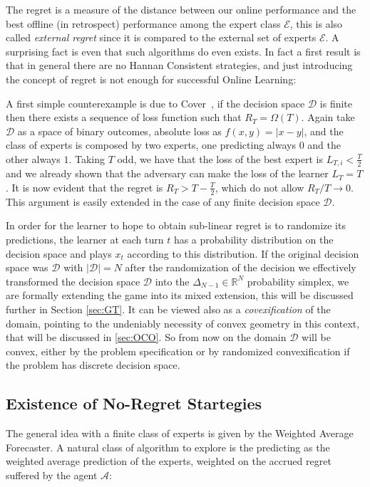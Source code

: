 The regret is a measure of the distance between our online performance and the best offline (in retrospect) performance among the expert class $\mathcal E$, this is also called \emph{external regret} since it is compared to the external set of experts $\mathcal E$. A surprising fact is even that such algorithms do even exists.
In fact a first result is that in general there are no Hannan Consistent strategies, and just introducing the concept of regret is not enough for successful Online Learning: 

A first simple counterexample is due to Cover~\cite{cover1966behavior}, if the decision space $\mathcal D$ is finite then there exists a sequence of loss function such that $R_T=\Omega(T)$.
Again take $\mathcal D$ as a space of binary outcomes, absolute loss as $f(x,y)=|x - y|$, and the class of experts is composed by two experts, one predicting always $0$ and the other always $1$. Taking $T$ odd, we have that the loss of the best expert is $L_{T,i}<\frac{T}{2}$ and we already shown that the adversary can make the loss of the learner $L_T=T$. It is now evident that the regret is $R_T>T-\frac{T}{2}$, which do not allow $R_T/T\to 0$. This argument is easily extended in the case of any finite decision space $\mathcal D$.

In order for the learner to hope to obtain sub-linear regret is to randomize its predictions, the learner at each turn $t$ has a probability distribution on the decision space and plays $x_t$ according to this distribution. If the original decision space was $\mathcal D$ with $|\mathcal D|=N$ after the randomization of the decision we effectively transformed the decision space $\mathcal D$ into the $\Delta_{N-1}\in\mathbb R^{N}$ probability simplex, we are formally extending the game into its mixed extension, this will be discussed further in Section \ref{sec:GT}. It can be viewed also as a \emph{covexification} of the domain, pointing to the undeniably necessity of convex geometry in this context, that will be discussed in \ref{sec:OCO}. So from now on the domain $\mathcal D$ will be convex, either by the problem specification or by randomized convexification if the problem has discrete decision space.

\subsection{Existence of No-Regret Startegies} 
The general idea with a finite class of experts is given by the Weighted Average Forecaster. A natural class of algorithm to explore is the predicting as the weighted average prediction of the experts, weighted on the accrued regret suffered by the agent $\mathcal A$:

